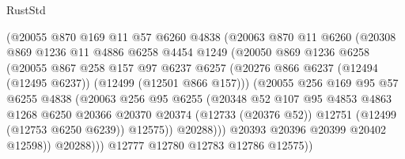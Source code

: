 \begin{lexlean}{RustStd}
\begin{coremodule}
                    (@20055
                      @870
                      @169
                      @11
                      @57
                      @6260
                      @4838
                      (@20063
                        @870
                        @11
                        @6260
                        (@20308
                          @869
                          @1236
                          @11
                          @4886
                          @6258
                          @4454
                          @1249
                          (@20050
                            @869
                            @1236
                            @6258
                            (@20055
                              @867
                              @258
                              @157
                              @97
                              @6237
                              @6257
                              (@20276
                                @866
                                @6237
                                (@12494 (@12495 @6237))
                                (@12499 (@12501 @866 @157)))
                              (@20055
                                @256
                                @169
                                @95
                                @57
                                @6255
                                @4838
                                (@20063
                                  @256
                                  @95
                                  @6255
                                  (@20348
                                    @52
                                    @107
                                    @95
                                    @4853
                                    @4863
                                    @1268
                                    @6250
                                    @20366
                                    @20370
                                    @20374
                                    (@12733 (@20376 @52))
                                    @12751
                                    (@12499 (@12753 @6250 @6239))
                                    @12575))
                                @20288)))
                          @20393
                          @20396
                          @20399
                          @20402
                          @12598))
                      @20288)))
                @12777
                @12780
                @12783
                @12786
                @12575))

\end{coremodule}
\end{lexlean}
